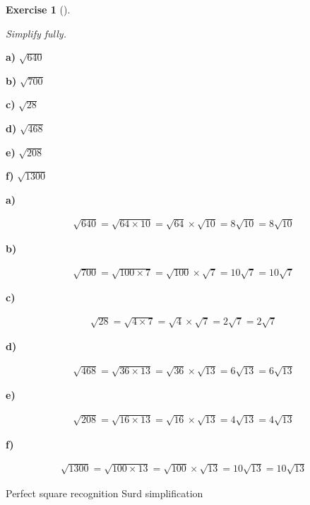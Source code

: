 \documentclass[
  letterpaper,
  DIV=11,
  numbers=noendperiod]{scrreprt}
\theoremstyle{definition}
\newtheorem{exercise}{Exercise}[chapter]
\theoremstyle{remark}
\begin{document}
\begin{exercise}[]\protect\hypertarget{exr-u2-40}{}\label{exr-u2-40}

\emph{Simplify fully.}

\textbf{a)} \(\displaystyle \sqrt{640}\)

\textbf{b)} \(\displaystyle \sqrt{700}\)

\textbf{c)} \(\displaystyle \sqrt{28}\)

\textbf{d)} \(\displaystyle \sqrt{468}\)

\textbf{e)} \(\displaystyle \sqrt{208}\)

\textbf{f)} \(\displaystyle \sqrt{1300}\)

\begin{tcolorbox}[enhanced jigsaw, opacitybacktitle=0.6, coltitle=black, arc=.35mm, colframe=quarto-callout-tip-color-frame, colback=white, bottomrule=.15mm, left=2mm, colbacktitle=quarto-callout-tip-color!10!white, titlerule=0mm, opacityback=0, title=\textcolor{quarto-callout-tip-color}{\faLightbulb}\hspace{0.5em}{🔍 View Solutions}, leftrule=.75mm, breakable, rightrule=.15mm, bottomtitle=1mm, toptitle=1mm, toprule=.15mm]

\textbf{a)}

\[
\begin{aligned}
\sqrt{640}=\sqrt{64\times 10}=\sqrt{64}\times\sqrt{10}=8\sqrt{10}=8\sqrt{10}
\end{aligned}
\]

\textbf{b)}

\[
\begin{aligned}
\sqrt{700}=\sqrt{100\times 7}=\sqrt{100}\times\sqrt{7}=10\sqrt{7}=10\sqrt{7}
\end{aligned}
\]

\textbf{c)}

\[
\begin{aligned}
\sqrt{28}=\sqrt{4\times 7}=\sqrt{4}\times\sqrt{7}=2\sqrt{7}=2\sqrt{7}
\end{aligned}
\]

\textbf{d)}

\[
\begin{aligned}
\sqrt{468}=\sqrt{36\times 13}=\sqrt{36}\times\sqrt{13}=6\sqrt{13}=6\sqrt{13}
\end{aligned}
\]

\textbf{e)}

\[
\begin{aligned}
\sqrt{208}=\sqrt{16\times 13}=\sqrt{16}\times\sqrt{13}=4\sqrt{13}=4\sqrt{13}
\end{aligned}
\]

\textbf{f)}

\[
\begin{aligned}
\sqrt{1300}=\sqrt{100\times 13}=\sqrt{100}\times\sqrt{13}=10\sqrt{13}=10\sqrt{13}
\end{aligned}
\]

\end{tcolorbox}

{Perfect square recognition} {Surd simplification}

\end{exercise}
\end{document}
